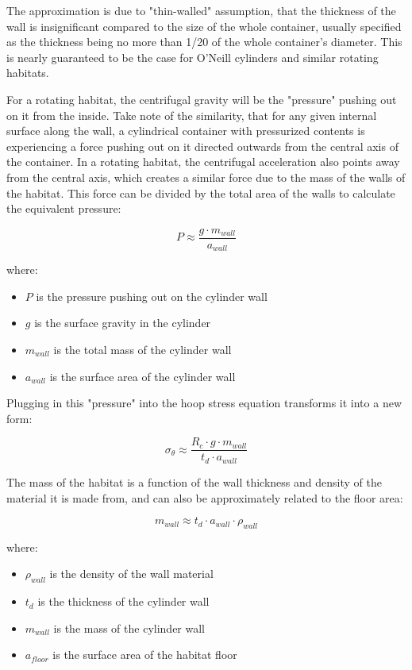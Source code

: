 \documentclass[a4paper]{article}
\begin{document}
	The approximation is due to "thin-walled" assumption, that the thickness of the wall is insignificant compared to the size of the whole container, usually specified as the thickness being no more than 1/20 of the whole container's diameter. This is nearly guaranteed to be the case for O'Neill cylinders and similar rotating habitats.
	
	\medskip
	
	For a rotating habitat, the centrifugal gravity will be the "pressure" pushing out on it from the inside. Take note of the similarity, that for any given internal surface along the wall, a cylindrical container with pressurized contents is experiencing a force pushing out on it directed outwards from the central axis of the container. In a rotating habitat, the centrifugal acceleration also points away from the central axis, which creates a similar force due to the mass of the walls of the habitat. This force can be divided by the total area of the walls to calculate the equivalent pressure:
	
	$$ P \approx \frac{g \cdot m_{wall}}{a_{wall}} $$
	
	where:
	
	\begin{itemize}
		\item $P$ is the pressure pushing out on the cylinder wall
		
		\item $g$ is the surface gravity in the cylinder
		
		\item $m_{wall}$ is the total mass of the cylinder wall
		
		\item $a_{wall}$ is the surface area of the cylinder wall
	\end{itemize}
	
	Plugging in this "pressure" into the hoop stress equation transforms it into a new form:
	
	$$ \sigma_\theta \approx \frac{R_c \cdot g \cdot m_{wall}}{t_d \cdot a_{wall}} $$
	
	The mass of the habitat is a function of the wall thickness and density of the material it is made from, and can also be approximately related to the floor area:
	
	$$ m_{wall} \approx t_d \cdot a_{wall} \cdot \rho_{wall}$$
	
	where:
	
	\begin{itemize}
		\item $\rho_{wall}$ is the density of the wall material
		
		\item $t_d$ is the thickness of the cylinder wall
		
		\item $m_{wall}$ is the mass of the cylinder wall
		
		\item $a_{floor}$ is the surface area of the habitat floor
	\end{itemize}
	
\end{document}
